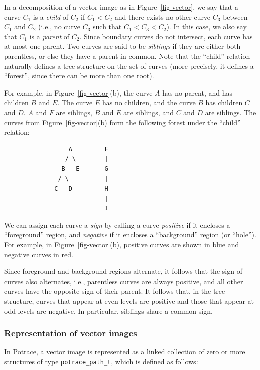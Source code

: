 \documentclass{article}
\begin{document}
In a decomposition of a vector image as in Figure~\ref{fig-vector}, we
say that a curve $C_1$ is a {\em child} of $C_2$ if $C_1 < C_2$ and
there exists no other curve $C_3$ between $C_1$ and $C_2$ (i.e., no
curve $C_3$ such that $C_1 < C_3 < C_2$). In this case, we also say
that $C_1$ is a {\em parent} of $C_2$. Since boundary curves do not
intersect, each curve has at most one parent.  Two curves are said to
be {\em siblings} if they are either both parentless, or else they
have a parent in common. Note that the ``child'' relation naturally
defines a tree structure on the set of curves (more precisely, it
defines a ``forest'', since there can be more than one root).

For example, in Figure~\ref{fig-vector}(b), the curve $A$ has no
parent, and has children $B$ and $E$. The curve $E$ has no children,
and the curve $B$ has children $C$ and $D$. $A$ and $F$ are siblings,
$B$ and $E$ are siblings, and $C$ and $D$ are siblings. The curves
from Figure~\ref{fig-vector}(b) form the following forest under the
``child'' relation:

\begin{verbatim}
                  A         F
                 / \        |
                B   E       G
               / \          |
              C   D         H
                            |
                            I
\end{verbatim}

We can assign each curve a {\em sign} by calling a curve {\em
  positive} if it encloses a ``foreground'' region, and {\em negative}
if it encloses a ``background'' region (or ``hole''). For example, in
Figure~\ref{fig-vector}(b), positive curves are shown in blue and
negative curves in red.

Since foreground and background regions alternate, it follows that the
sign of curves also alternates, i.e., parentless curves are always
positive, and all other curves have the opposite sign of their parent.
It follows that, in the tree structure, curves that appear at even
levels are positive and those that appear at odd levels are negative.
In particular, siblings share a common sign.

\subsubsection{Representation of vector images}\label{sssec-vector}

In Potrace, a vector image is represented as a linked collection of
zero or more structures of type \verb!potrace_path_t!, which is
defined as follows:
\end{document}
